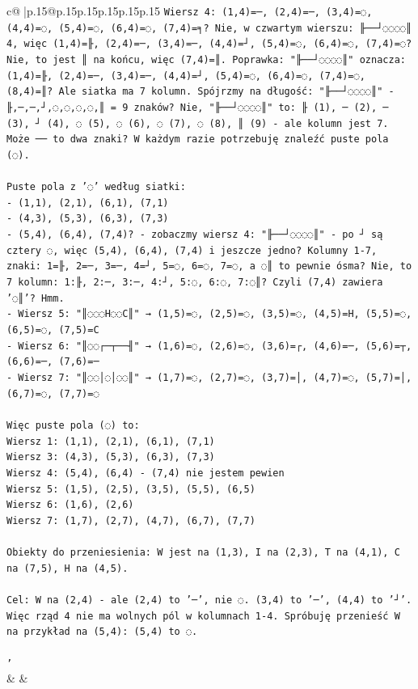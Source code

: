 \documentclass{article}
\begin{document}
{\begin{supertabular}{c@{$\;$}|p{.15\linewidth}@{}p{.15\linewidth}p{.15\linewidth}p{.15\linewidth}p{.15\linewidth}p{.15\linewidth}}
{{{\texttt{Wiersz 4: (1,4)=─, (2,4)=─, (3,4)=◌, (4,4)=◌, (5,4)=◌, (6,4)=◌, (7,4)=╕? Nie, w czwartym wierszu: ╟──┘◌◌◌◌║ 4, więc (1,4)=╟, (2,4)=─, (3,4)=─, (4,4)=┘, (5,4)=◌, (6,4)=◌, (7,4)=◌? Nie, to jest ║ na końcu, więc (7,4)=║. Poprawka: "╟──┘◌◌◌◌║" oznacza: (1,4)=╟, (2,4)=─, (3,4)=─, (4,4)=┘, (5,4)=◌, (6,4)=◌, (7,4)=◌, (8,4)=║? Ale siatka ma 7 kolumn. Spójrzmy na długość: "╟──┘◌◌◌◌║" {-} ╟,─,─,┘,◌,◌,◌,◌,║ = 9 znaków? Nie, "╟──┘◌◌◌◌║" to: ╟ (1), ─ (2), ─ (3), ┘ (4), ◌ (5), ◌ (6), ◌ (7), ◌ (8), ║ (9) {-} ale kolumn jest 7. Może ── to dwa znaki? W każdym razie potrzebuję znaleźć puste pola (◌).} \\
\\ 
\texttt{Puste pola z '◌' według siatki:} \\
\texttt{{-} (1,1), (2,1), (6,1), (7,1)} \\
\texttt{{-} (4,3), (5,3), (6,3), (7,3)} \\
\texttt{{-} (5,4), (6,4), (7,4)? {-} zobaczmy wiersz 4: "╟──┘◌◌◌◌║" {-} po ┘ są cztery ◌, więc (5,4), (6,4), (7,4) i jeszcze jedno? Kolumny 1{-}7, znaki: 1=╟, 2=─, 3=─, 4=┘, 5=◌, 6=◌, 7=◌, a ◌║ to pewnie ósma? Nie, to 7 kolumn: 1:╟, 2:─, 3:─, 4:┘, 5:◌, 6:◌, 7:◌║? Czyli (7,4) zawiera '◌║'? Hmm.} \\
\texttt{{-} Wiersz 5: "║◌◌◌H◌◌C║" → (1,5)=◌, (2,5)=◌, (3,5)=◌, (4,5)=H, (5,5)=◌, (6,5)=◌, (7,5)=C} \\
\texttt{{-} Wiersz 6: "║◌◌┌─┬──╢" → (1,6)=◌, (2,6)=◌, (3,6)=┌, (4,6)=─, (5,6)=┬, (6,6)=─, (7,6)=─} \\
\texttt{{-} Wiersz 7: "║◌◌│◌│◌◌║" → (1,7)=◌, (2,7)=◌, (3,7)=│, (4,7)=◌, (5,7)=│, (6,7)=◌, (7,7)=◌} \\
\\ 
\texttt{Więc puste pola (◌) to:} \\
\texttt{Wiersz 1: (1,1), (2,1), (6,1), (7,1)} \\
\texttt{Wiersz 3: (4,3), (5,3), (6,3), (7,3)} \\
\texttt{Wiersz 4: (5,4), (6,4) {-} (7,4) nie jestem pewien} \\
\texttt{Wiersz 5: (1,5), (2,5), (3,5), (5,5), (6,5)} \\
\texttt{Wiersz 6: (1,6), (2,6)} \\
\texttt{Wiersz 7: (1,7), (2,7), (4,7), (6,7), (7,7)} \\
\\ 
\texttt{Obiekty do przeniesienia: W jest na (1,3), I na (2,3), T na (4,1), C na (7,5), H na (4,5).} \\
\\ 
\texttt{Cel: W na (2,4) {-} ale (2,4) to '─', nie ◌. (3,4) to '─', (4,4) to '┘'. Więc rząd 4 nie ma wolnych pól w kolumnach 1{-}4. Spróbuję przenieść W na przykład na (5,4): (5,4) to ◌.} \\
\\ 
\texttt{'} \\
            }
        }
    }
    & & \\ \\


\end{supertabular}}
\end{document}

